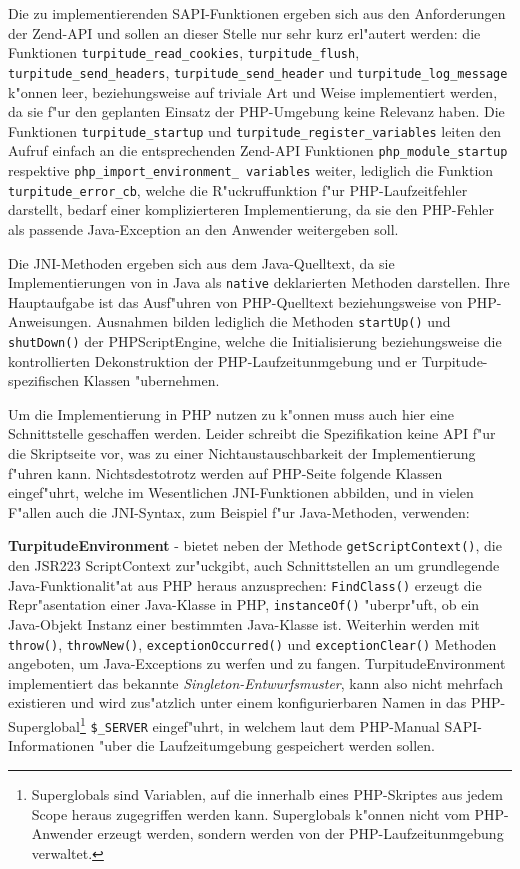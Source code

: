 Die zu implementierenden SAPI-Funktionen ergeben sich aus den Anforderungen der Zend-API und sollen an dieser Stelle nur
sehr kurz erl"autert werden: die Funktionen \texttt{turpitude\_read\_cookies}, \texttt{turpitude\_flush}, \texttt{turpitude\_send\_headers},
\texttt{turpitude\_send\_header} und \texttt{turpitude\_log\_message} k"onnen leer, beziehungsweise auf triviale Art und Weise
implementiert werden, da sie f"ur den geplanten Einsatz der PHP-Umgebung keine Relevanz haben. Die Funktionen
\texttt{turpitude\_startup} und \texttt{turpitude\_register\_variables} leiten den Aufruf einfach an die entsprechenden
Zend-API Funktionen \texttt{php\_module\_startup} respektive \texttt{php\_import\_environment\_ variables} weiter, lediglich
die Funktion \texttt{turpitude\_error\_cb}, welche die R"uckruffunktion f"ur PHP-Laufzeitfehler darstellt, bedarf einer
komplizierteren Implementierung, da sie den PHP-Fehler als passende Java-Exception an den Anwender weitergeben soll.

Die JNI-Methoden ergeben sich aus dem Java-Quelltext, da sie Implementierungen von in Java als \texttt{native} deklarierten 
Methoden darstellen. Ihre Hauptaufgabe ist das Ausf"uhren von PHP-Quelltext beziehungsweise von PHP-Anweisungen.
Ausnahmen bilden lediglich die Methoden \texttt{startUp()} und \texttt{shutDown()} der PHPScriptEngine, welche
die Initialisierung beziehungsweise die kontrollierten Dekonstruktion der PHP-Laufzeitunmgebung und er Turpitude-spezifischen
Klassen "ubernehmen.

Um die Implementierung in PHP nutzen zu k"onnen muss auch hier eine Schnittstelle geschaffen werden. Leider schreibt
die Spezifikation keine API f"ur die Skriptseite vor, was zu einer Nichtaustauschbarkeit der Implementierung f"uhren kann.
Nichtsdestotrotz werden auf PHP-Seite folgende Klassen eingef"uhrt, welche im Wesentlichen JNI-Funktionen abbilden, und
in vielen F"allen auch die JNI-Syntax, zum Beispiel f"ur Java-Methoden, verwenden:

\textbf{TurpitudeEnvironment} - bietet neben der Methode \texttt{getScriptContext()}, die den JSR223 ScriptContext zur"uckgibt,
auch Schnittstellen an um grundlegende Java-Funktionalit"at aus PHP heraus anzusprechen:
\texttt{FindClass()} erzeugt die Repr"asentation einer Java-Klasse in PHP, \texttt{instanceOf()} "uberpr"uft, ob ein Java-Objekt 
Instanz einer bestimmten Java-Klasse ist. Weiterhin werden mit \texttt{throw()}, \texttt{throwNew()}, \texttt{exceptionOccurred()} und 
\texttt{exceptionClear()} Methoden angeboten, um Java-Exceptions zu werfen und zu fangen. TurpitudeEnvironment implementiert
das bekannte \emph{Singleton-Entwurfsmuster}, kann also nicht mehrfach existieren und wird zus"atzlich unter einem konfigurierbaren
Namen in das PHP-Superglobal\footnote{
Superglobals sind Variablen, auf die innerhalb eines PHP-Skriptes aus jedem Scope heraus zugegriffen werden kann. Superglobals k"onnen
nicht vom PHP-Anwender erzeugt werden, sondern werden von der PHP-Laufzeitunmgebung verwaltet.
} \texttt{\$\_SERVER} eingef"uhrt, in welchem laut dem PHP-Manual \cite{PHPMAN} SAPI-Informationen "uber die
Laufzeitumgebung gespeichert werden sollen.

